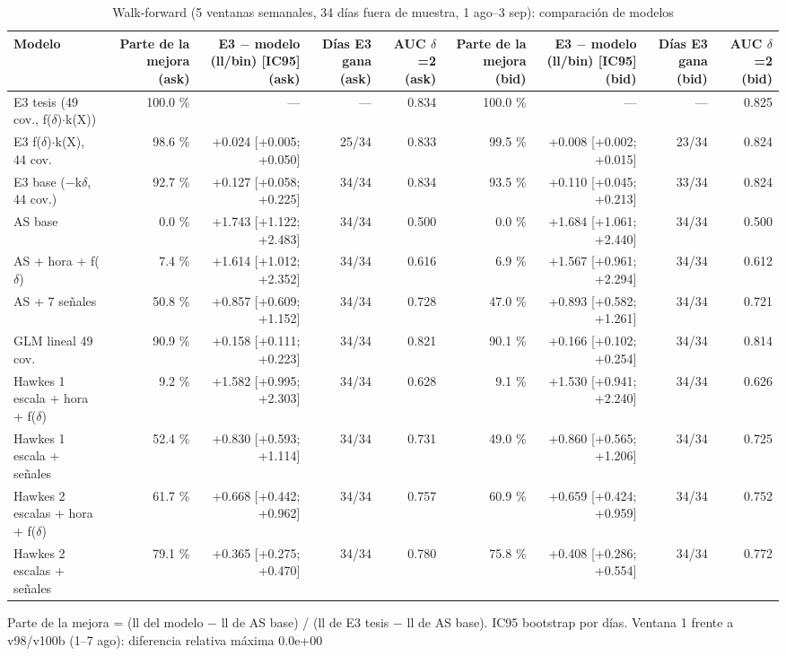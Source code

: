 \begin{table}[htbp]
\centering
\small
\caption{Walk-forward (5 ventanas semanales, 34 días fuera de muestra, 1 ago–3 sep): comparación de modelos}
\label{tab:T1_walkforward_resumen}
\begin{tabular}{lrrrrrrrr}
\toprule
Modelo & Parte de la mejora (ask) & E3 $-$ modelo (ll/bin) [IC95] (ask) & Días E3 gana (ask) & AUC $\delta$=2 (ask) & Parte de la mejora (bid) & E3 $-$ modelo (ll/bin) [IC95] (bid) & Días E3 gana (bid) & AUC $\delta$=2 (bid) \\
\midrule
E3 tesis (49 cov., f($\delta$)$\cdot$k(X)) & 100.0 \% & — & — & 0.834 & 100.0 \% & — & — & 0.825 \\
E3 f($\delta$)$\cdot$k(X), 44 cov. & 98.6 \% & +0.024 [+0.005; +0.050] & 25/34 & 0.833 & 99.5 \% & +0.008 [+0.002; +0.015] & 23/34 & 0.824 \\
E3 base ($-$k$\delta$, 44 cov.) & 92.7 \% & +0.127 [+0.058; +0.225] & 34/34 & 0.834 & 93.5 \% & +0.110 [+0.045; +0.213] & 33/34 & 0.824 \\
AS base & 0.0 \% & +1.743 [+1.122; +2.483] & 34/34 & 0.500 & 0.0 \% & +1.684 [+1.061; +2.440] & 34/34 & 0.500 \\
AS + hora + f($\delta$) & 7.4 \% & +1.614 [+1.012; +2.352] & 34/34 & 0.616 & 6.9 \% & +1.567 [+0.961; +2.294] & 34/34 & 0.612 \\
AS + 7 señales & 50.8 \% & +0.857 [+0.609; +1.152] & 34/34 & 0.728 & 47.0 \% & +0.893 [+0.582; +1.261] & 34/34 & 0.721 \\
GLM lineal 49 cov. & 90.9 \% & +0.158 [+0.111; +0.223] & 34/34 & 0.821 & 90.1 \% & +0.166 [+0.102; +0.254] & 34/34 & 0.814 \\
Hawkes 1 escala + hora + f($\delta$) & 9.2 \% & +1.582 [+0.995; +2.303] & 34/34 & 0.628 & 9.1 \% & +1.530 [+0.941; +2.240] & 34/34 & 0.626 \\
Hawkes 1 escala + señales & 52.4 \% & +0.830 [+0.593; +1.114] & 34/34 & 0.731 & 49.0 \% & +0.860 [+0.565; +1.206] & 34/34 & 0.725 \\
Hawkes 2 escalas + hora + f($\delta$) & 61.7 \% & +0.668 [+0.442; +0.962] & 34/34 & 0.757 & 60.9 \% & +0.659 [+0.424; +0.959] & 34/34 & 0.752 \\
Hawkes 2 escalas + señales & 79.1 \% & +0.365 [+0.275; +0.470] & 34/34 & 0.780 & 75.8 \% & +0.408 [+0.286; +0.554] & 34/34 & 0.772 \\
\bottomrule
\end{tabular}
\par\smallskip\footnotesize Parte de la mejora = (ll del modelo $-$ ll de AS base) / (ll de E3 tesis $-$ ll de AS base). IC95 bootstrap por días. Ventana 1 frente a v98/v100b (1–7 ago): diferencia relativa máxima 0.0e+00
\end{table}
